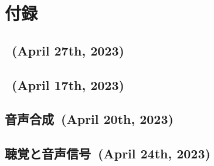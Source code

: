 \chapter*{付録}
\pagestyle{appendixstyle}
\setcounter{section}{0}
\renewcommand{\thelstlisting}{\thesection-\arabic{lstlisting}}
\renewcommand{\thesection}{\Alph{section}}
\newcommand{\secref}[1]{[#1]{#1}}
\makeatletter
{}
\makeatother
{}
\section{\kadaia\ (April 27th, 2023)}





\section{\kadaib\ (April 17th, 2023)}
\section{音声合成\ (April 20th, 2023)}
\section{聴覚と音声信号\ (April 24th, 2023)}